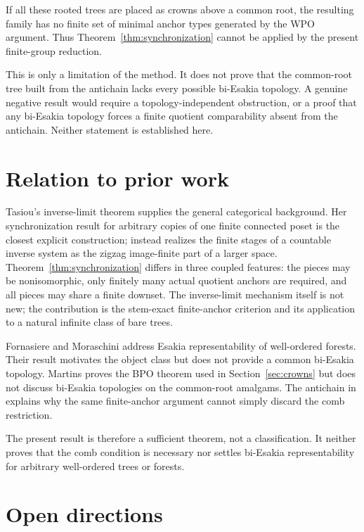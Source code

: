 \documentclass[11pt]{article}
\theoremstyle{remark}
\numberwithin{equation}{section}
\begin{document}
If all these rooted trees are placed as crowns above a common root, the
resulting family has no finite set of minimal anchor types generated by the WPO
argument. Thus Theorem~\ref{thm:synchronization} cannot be applied by the
present finite-group reduction.

This is only a limitation of the method. It does not prove that the common-root
tree built from the antichain lacks every possible bi-Esakia topology. A
genuine negative result would require a topology-independent obstruction, or a
proof that any bi-Esakia topology forces a finite quotient comparability absent
from the antichain. Neither statement is established here.

\section{Relation to prior work}

Tasiou's inverse-limit theorem \cite[Theorem 4.2.6]{ref1} supplies the general
categorical background. Her synchronization result for arbitrary copies of one
finite connected poset \cite[Theorem 4.3.4]{ref1}\cite[Theorem 4.6]{ref2} is
the closest explicit construction;
\cite[Theorem 4.3.8]{ref1}\cite[Theorem 4.3]{ref2} instead realizes the finite
stages of a countable inverse system as the zigzag image-finite part of a larger
space. Theorem~\ref{thm:synchronization} differs in three coupled features: the
pieces may be nonisomorphic, only finitely many actual quotient anchors are
required, and all pieces may share a finite downset. The inverse-limit mechanism
itself is not new; the contribution is the stem-exact finite-anchor criterion
and its application to a natural infinite class of bare trees.

Fornasiere and Moraschini \cite{ref4} address Esakia representability of
well-ordered forests. Their result motivates the object class but does not
provide a common bi-Esakia topology. Martins \cite{ref5} proves the BPO theorem
used in Section~\ref{sec:crowns} but does not discuss bi-Esakia topologies on
the common-root amalgams. The antichain in \cite{ref3} explains why the same
finite-anchor argument cannot simply discard the comb restriction.

The present result is therefore a sufficient theorem, not a classification. It
neither proves that the comb condition is necessary nor settles bi-Esakia
representability for arbitrary well-ordered trees or forests.

\section{Open directions}
\end{document}
